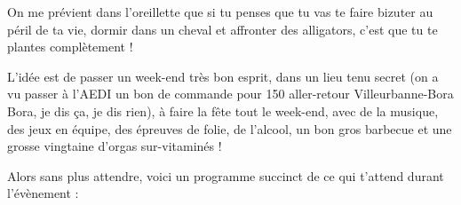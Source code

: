 On me prévient dans l'oreillette que si tu penses que tu vas te faire bizuter au
péril de ta vie, dormir dans un cheval et affronter des alligators, c'est que tu
te plantes complètement !

L'idée est de passer un week-end très bon esprit, dans un lieu tenu secret (on a
vu passer à l'AEDI un bon de commande pour 150 aller-retour
Villeurbanne-Bora Bora, je dis ça, je dis rien), à faire la fête tout le
week-end, avec de la musique, des jeux en équipe, des épreuves de folie, de
l'alcool, un bon gros barbecue et une grosse vingtaine d'orgas sur-vitaminés !

Alors sans plus attendre, voici un programme succinct de ce qui t'attend durant
l'évènement :
